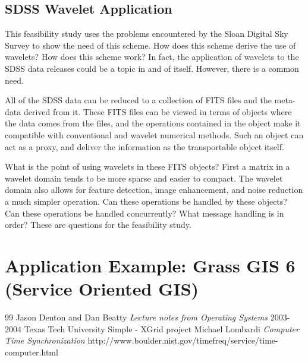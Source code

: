 \documentclass[11pt]{article}
\begin{document}
 
 \subsection {SDSS Wavelet Application}
 This feasibility study uses the problems encountered by the Sloan Digital Sky Survey to show the need of this scheme.   How does this scheme derive the use of wavelets?  How does this scheme work?   In fact, the application of wavelets to the SDSS data releases could be a topic in and of itself.  However, there is a common need.   

All of the SDSS data can be reduced to a collection of FITS files and the meta-data derived from it.  These FITS files can be viewed in terms of objects where the data comes from the files, and the operations contained in the object make it compatible with conventional and wavelet numerical methods.   Such an object can act as a proxy, and deliver the information as the transportable object itself.   

What is the point of using wavelets in these FITS objects?  First a matrix in a wavelet domain tends to be more sparse and easier to compact.  The wavelet domain also allows for feature detection,  image enhancement,  and noise reduction a much simpler operation.   Can these operations be handled by  these objects?  Can these operations be handled concurrently?  What message handling is in order?  These are questions for the feasibility study.  %


 \section {Application Example: Grass GIS 6 (Service Oriented GIS)}
 
 
 \begin {thebibliography}{99}
  Jason Denton and Dan Beatty  \textsl{Lecture notes from Operating Systems} 2003-2004 Texas Tech University
  Simple - XGrid project 
 Michael Lombardi \textsl {Computer Time Synchronization}  http://www.boulder.nist.gov/timefreq/service/time-computer.html
 \end{thebibliography}
 
  
\end{document}
